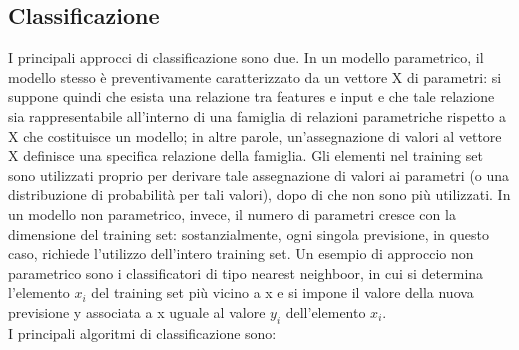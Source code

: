 \subsection{Classificazione}
I principali approcci di classificazione sono due. In un modello parametrico, il modello stesso è preventivamente caratterizzato da un vettore X di parametri: si suppone quindi che esista una relazione tra features e input e che tale relazione sia rappresentabile all’interno di una famiglia di
relazioni parametriche rispetto a X che costituisce un modello; in altre parole, un'assegnazione di valori al vettore X definisce una specifica relazione della famiglia. Gli elementi nel training set sono utilizzati proprio per derivare tale
assegnazione di valori ai parametri (o una distribuzione di probabilità per tali valori), dopo di che non sono più utilizzati. In un modello non parametrico, invece, il numero di parametri cresce con la dimensione del training set: sostanzialmente, ogni singola previsione, in questo caso, richiede l’utilizzo dell’intero training set. Un esempio di approccio non parametrico sono i classificatori di tipo nearest neighboor, in cui si determina l'elemento $x_i$ del training set più vicino a x e si impone il valore della nuova previsione y associata a x uguale al valore $y_i$ dell’elemento $x_i$.\\
I principali algoritmi di classificazione sono:
